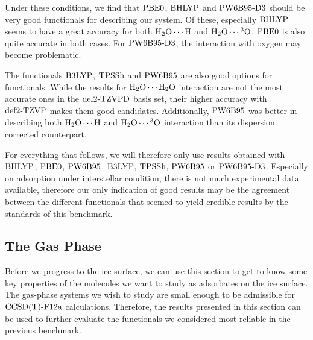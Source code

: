 Under these conditions, we find that $\text{PBE0}$, $\text{BHLYP}$ and $\text{PW6B95}\text{-D3}$ should be
very good functionals for describing our system. Of these, especially $\text{BHLYP}$
seems to have a great accuracy for both $\mbox{\ensuremath{\text H _2 \text O \cdots \text H}}$ and $\mbox{\ensuremath{\text H _2 \text O \cdots \hspace{.2pt} ^3\text{O}}}$. $\text{PBE0}$ is also
quite accurate in both cases. For $\text{PW6B95}\text{-D3}$, the interaction with oxygen
may become problematic. 

The functionals $\text{B3LYP}$, $\text{TPSSh}$ and $\text{PW6B95}$ are also good options for
functionals. While the results for $\mbox{\ensuremath{\text H _2 \text O \cdots \text H _2 \text O}}$ interaction are not the most
accurate ones in the $\text{def2-TZVPD}$ basis set, their higher accuracy with $\text{def2-TZVP}$
makes them good candidates. Additionally, $\text{PW6B95}$ was better in describing both
$\mbox{\ensuremath{\text H _2 \text O \cdots \text H}}$ and $\mbox{\ensuremath{\text H _2 \text O \cdots \hspace{.2pt} ^3\text{O}}}$ interaction than its dispersion corrected counterpart.

For everything that follows, we will therefore only use results obtained
with $\text{BHLYP}$, $\text{PBE0}$, $\text{PW6B95}$, $\text{B3LYP}$, $\text{TPSSh}$, $\text{PW6B95}$ or $\text{PW6B95}\text{-D3}$.
Especially on adsorption under interstellar condition, there is not much experimental
data available, therefore our only indication of good results may be
the agreement between the different functionals that seemed to yield credible
results by the standards of this benchmark.
  
\subsection{The Gas Phase}
\label{Sec:Gas}

Before we progress to the ice surface, we can use this section
to get to know some key properties of the molecules we want to
study as adsorbates on the ice surface. The gas-phase systems
we wish to study are small enough to be admissible for $\text{CCSD(T)-F12a}$
calculations. Therefore, the results presented in this section can
be used to further evaluate the functionals we considered most
reliable in the previous benchmark.

